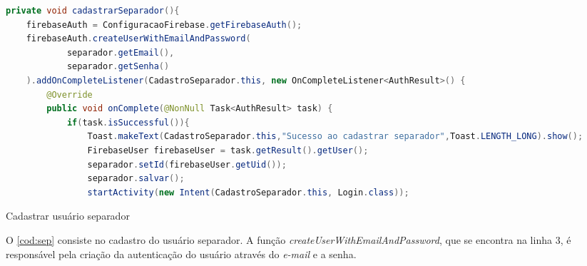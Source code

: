 \begin{codigo}[H]
	\begin{lstlisting}[language=Java]
private void cadastrarSeparador(){
    firebaseAuth = ConfiguracaoFirebase.getFirebaseAuth();
    firebaseAuth.createUserWithEmailAndPassword(
            separador.getEmail(),
            separador.getSenha()
    ).addOnCompleteListener(CadastroSeparador.this, new OnCompleteListener<AuthResult>() {
        @Override
        public void onComplete(@NonNull Task<AuthResult> task) {
            if(task.isSuccessful()){
                Toast.makeText(CadastroSeparador.this,"Sucesso ao cadastrar separador",Toast.LENGTH_LONG).show();
                FirebaseUser firebaseUser = task.getResult().getUser();
                separador.setId(firebaseUser.getUid());
                separador.salvar();
                startActivity(new Intent(CadastroSeparador.this, Login.class));
       	\end{lstlisting}
       	\caption{Cadastrar usuário separador}
       	\label{cod:sep}
\end{codigo}

O \autoref{cod:sep} consiste no cadastro do usuário separador. A função \textit{createUserWithEmailAndPassword}, que se encontra na linha 3, é responsável pela criação da autenticação do usuário através do \textit{e-mail} e a senha.